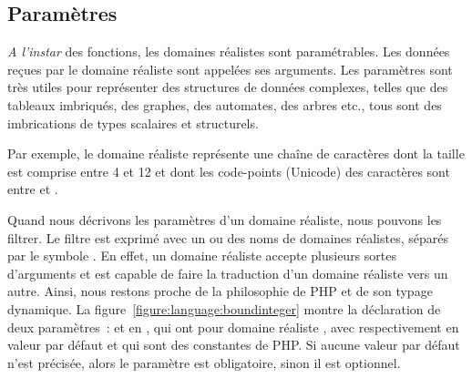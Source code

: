\subsection{Paramètres}
\label{subsection:language:realdom:parameters}

{\em A l'instar} des fonctions, les domaines réalistes sont {\strong
paramétrables}. Les données reçues par le domaine réaliste sont appelées ses
{\strong arguments}. Les paramètres sont très utiles pour représenter des
structures de données complexes, telles que des tableaux imbriqués, des graphes,
des automates, des arbres etc., tous sont des imbrications de types scalaires et
structurels.

\begin{example}

Par exemple, le domaine réaliste 
représente une chaîne de caractères dont la taille est comprise entre 4 et 12 et
dont les code-points (Unicode) des caractères sont entre  et
.

\end{example}

Quand nous décrivons les paramètres d'un domaine réaliste, nous pouvons les
filtrer. Le filtre est exprimé avec un ou des noms de domaines réalistes,
séparés par le symbole \code{$\vert$}. En effet, un domaine réaliste accepte
plusieurs sortes d'arguments et est capable de faire la traduction d'un domaine
réaliste vers un autre. Ainsi, nous restons proche de la philosophie de PHP et
de son typage dynamique. La figure~\ref{figure:language:boundinteger} montre la
déclaration de deux paramètres~:  et  en ,
qui ont pour domaine réaliste , avec respectivement en valeur
par défaut  et  qui sont des constantes
de PHP. Si aucune valeur par défaut n'est précisée, alors le paramètre est
{\strong obligatoire}, sinon il est {\strong optionnel}.

